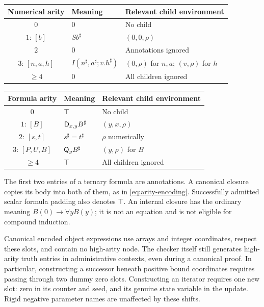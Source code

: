 \begin{center}
\begin{tabular}{cll}
\toprule
Numerical arity & Meaning & Relevant child environment\\
\midrule
$0$ & $0$ & No child\\
$1$: $[b]$ & $Sb^\sharp$ & $(0,0,\rho)$\\
$2$ & $0$ & Annotations ignored\\
$3$: $[n,a,h]$ & $I(n^\sharp,a^\sharp;v.h^\sharp)$ & $(0,\rho)$ for $n,a$; $(v,\rho)$ for $h$\\
$\geq4$ & $0$ & All children ignored\\
\bottomrule
\end{tabular}
\end{center}

\begin{center}
\begin{tabular}{cll}
\toprule
Formula arity & Meaning & Relevant child environment\\
\midrule
$0$ & $\top$ & No child\\
$1$: $[B]$ & $\mathsf D_{x,y}B^\sharp$ & $(y,x,\rho)$\\
$2$: $[s,t]$ & $s^\sharp=t^\sharp$ & $\rho$ numerically\\
$3$: $[P,U,B]$ & $\mathsf Q_yB^\sharp$ & $(y,\rho)$ for $B$\\
$\geq4$ & $\top$ & All children ignored\\
\bottomrule
\end{tabular}
\end{center}

The first two entries of a ternary formula are annotations.  A canonical
closure copies its body into both of them, as in
\eqref{eq:arity-encoding}.  Successfully admitted scalar formula padding
also denotes $\top$.  An internal closure has the ordinary meaning
$B(0)\to\forall yB(y)$; it is not an equation and is not eligible for
compound induction.

Canonical encoded object expressions use arrays and integer coordinates,
respect these slots, and contain no high-arity node.  The checker itself
still generates high-arity truth entries in administrative contexts,
even during a canonical proof.  In particular, constructing a
successor beneath positive bound coordinates requires passing through
two dummy zero slots.  Constructing an iterator requires one new slot:
zero in its counter and seed, and its genuine state variable in the
update.  Rigid negative parameter names are unaffected by these shifts.

